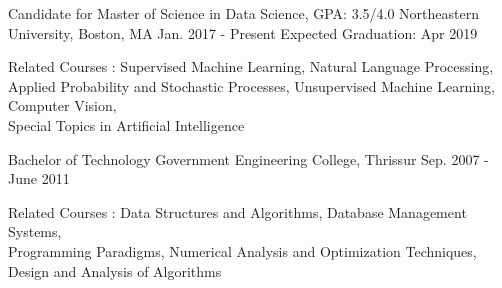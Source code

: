 \vspace{-0.1cm}
\begin{cventries}
  \cventry
    {Candidate for Master of Science in Data Science, GPA: 3.5/4.0}
    {Northeastern University, Boston, MA}
    {Jan. 2017 - Present}
    {Expected Graduation: Apr 2019 }
    {
      \begin{cvitems}
      \item {Related Courses : Supervised Machine Learning, Natural Language Processing, \\ Applied Probability and Stochastic Processes, Unsupervised Machine Learning, Computer Vision, \\Special Topics in Artificial Intelligence}
      \end{cvitems}
    }
      \cventry
    {Bachelor of Technology}
    {Government Engineering College, Thrissur}
    {Sep. 2007 - June 2011}
    {}
    {
      \begin{cvitems}
      \item {Related Courses : Data Structures and Algorithms, Database Management Systems, \\
          Programming Paradigms, Numerical Analysis and Optimization Techniques, Design and Analysis of Algorithms}
      \end{cvitems}
    }
\end{cventries}

